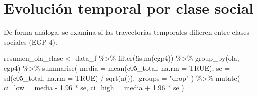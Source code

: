 \documentclass[
  spanish,
  a4paper,
  oneside]{scrbook}
\newenvironment{Shaded}{\begin{snugshade}}{\end{snugshade}}
\newcommand{\AttributeTok}[1]{\textcolor[rgb]{0.40,0.45,0.13}{#1}}
\newcommand{\ConstantTok}[1]{\textcolor[rgb]{0.56,0.35,0.01}{#1}}
\newcommand{\FloatTok}[1]{\textcolor[rgb]{0.68,0.00,0.00}{#1}}
\newcommand{\FunctionTok}[1]{\textcolor[rgb]{0.28,0.35,0.67}{#1}}
\newcommand{\NormalTok}[1]{\textcolor[rgb]{0.00,0.23,0.31}{#1}}
\newcommand{\OtherTok}[1]{\textcolor[rgb]{0.00,0.23,0.31}{#1}}
\newcommand{\SpecialCharTok}[1]{\textcolor[rgb]{0.37,0.37,0.37}{#1}}
\newcommand{\StringTok}[1]{\textcolor[rgb]{0.13,0.47,0.30}{#1}}
\begin{document}
\section{Evolución temporal por clase
social}\label{evoluciuxf3n-temporal-por-clase-social}

De forma análoga, se examina si las trayectorias temporales difieren
entre clases sociales (EGP-4).

\begin{Shaded}
\begin{Highlighting}[]
\NormalTok{resumen\_ola\_clase }\OtherTok{\textless{}{-}}\NormalTok{ data\_f }\SpecialCharTok{\%\textgreater{}\%}
  \FunctionTok{filter}\NormalTok{(}\SpecialCharTok{!}\FunctionTok{is.na}\NormalTok{(egp4)) }\SpecialCharTok{\%\textgreater{}\%}
  \FunctionTok{group\_by}\NormalTok{(ola, egp4) }\SpecialCharTok{\%\textgreater{}\%}
  \FunctionTok{summarise}\NormalTok{(}
    \AttributeTok{media   =} \FunctionTok{mean}\NormalTok{(c05\_total, }\AttributeTok{na.rm =} \ConstantTok{TRUE}\NormalTok{),}
    \AttributeTok{se      =} \FunctionTok{sd}\NormalTok{(c05\_total, }\AttributeTok{na.rm =} \ConstantTok{TRUE}\NormalTok{) }\SpecialCharTok{/} \FunctionTok{sqrt}\NormalTok{(}\FunctionTok{n}\NormalTok{()),}
    \AttributeTok{.groups =} \StringTok{"drop"}
\NormalTok{  ) }\SpecialCharTok{\%\textgreater{}\%}
  \FunctionTok{mutate}\NormalTok{(}
    \AttributeTok{ci\_low  =}\NormalTok{ media }\SpecialCharTok{{-}} \FloatTok{1.96} \SpecialCharTok{*}\NormalTok{ se,}
    \AttributeTok{ci\_high =}\NormalTok{ media }\SpecialCharTok{+} \FloatTok{1.96} \SpecialCharTok{*}\NormalTok{ se}
\NormalTok{  )}


\end{Highlighting}
\end{Shaded}
\end{document}

